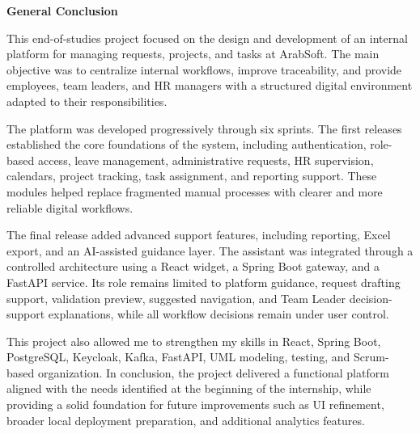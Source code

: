  \vspace{6pt}

  \clearpage
  \thispagestyle{plain}

  {\fontsize{12}{16}\selectfont
  \setlength{\parindent}{1.2cm}
  \setlength{\parskip}{4pt}

  \begin{center}
  {\Large\bfseries General Conclusion}
  \end{center}

  \vspace{0.25cm}

  This end-of-studies project focused on the design and development of an internal platform for managing requests, projects, and tasks at ArabSoft. The main objective was to centralize internal workflows, improve traceability, and provide employees, team leaders, and HR managers with a structured digital environment adapted to their responsibilities.

  The platform was developed progressively through six sprints. The first releases established the core foundations of the system, including authentication, role-based access, leave management, administrative requests, HR supervision, calendars, project tracking, task assignment, and reporting support. These modules helped replace fragmented manual processes with clearer and more reliable digital workflows.

  The final release added advanced support features, including reporting, Excel export, and an AI-assisted guidance layer. The assistant was integrated through a controlled architecture using a React widget, a Spring Boot gateway, and a FastAPI service. \cite{fastapi_docs} Its role remains limited to platform guidance, request drafting support, validation preview, suggested navigation, and Team Leader decision-support explanations, while all workflow decisions remain under user control.

  This project also allowed me to strengthen my skills in React, Spring Boot, PostgreSQL, Keycloak, Kafka, FastAPI, UML modeling, testing, and Scrum-based organization. In conclusion, the project delivered a functional platform aligned with the needs identified at the beginning of the internship, while providing a solid foundation for future improvements such as UI refinement, broader local deployment preparation, and additional analytics features.

  }
